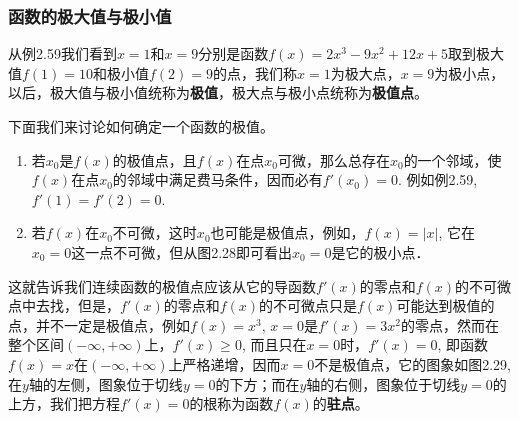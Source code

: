 \subsubsection{函数的极大值与极小值}

从例2.59我们看到$x=1$和$x=9$分别是函数$f(x)=2x^3-9x^2+12x+5$取到极大值$f(1)=10$和极小值$f(2)=9$的点，我们称$x=1$为极大点，$x=9$为极小点，以后，极大值与极小值统称为\textbf{极值}，极大点与极小点统称为\textbf{极值点}。

下面我们来讨论如何确定一个函数的极值。
\begin{enumerate}
    \item 若$x_0$是$f(x)$的极值点，且$f(x)$在点$x_0$可微，那么总存在$x_0$的一个邻域，使$f(x)$在点$x_0$的邻域中满足费马条件，因而必有$f'(x_0)=0$. 例如例2.59, $f'(1)=f' (2) =0$.
    \item 若$f(x)$在$x_0$不可微，这时$x_0$也可能是极值点，例如，$f(x)=|x|$, 它在$x_0=0$这一点不可微，但从图2.28即可看出$x_0=0$是它的极小点．
\end{enumerate}

\begin{figure}[htp]
    \centering
    \begin{minipage}[t]{0.48\textwidth}
    \centering
{}
    \caption{}
    \end{minipage}
    \begin{minipage}[t]{0.48\textwidth}
    \centering
    \caption{}
    \end{minipage}
    \end{figure}


这就告诉我们连续函数的极值点应该从它的导函数$f'(x)$的零点和$f(x)$的不可微点中去找，但是，$f'(x)$的零点和$f(x)$的不可微点只是$f(x)$可能达到极值的点，并不一定是极值点，例如$f(x)=x^3$, $x=0$是$f'(x)=3x^2$的零点，然而在整个区间$(-\infty,+\infty)$上，$f'(x)\ge 0$, 而且只在$x=0$时，$f'(x)=0$, 即函数$f(x)=x$在$(-\infty,+\infty)$上严格递增，因而$x=0$不是极值点，它的图象如图2.29, 在$y$轴的左侧，图象位于切线$y=0$的下方；而在$y$轴的右侧，图象位于切线$y=0$的上方，我们把方程$f'(x)=0$的根称为函数$f(x)$的\textbf{驻点}。

